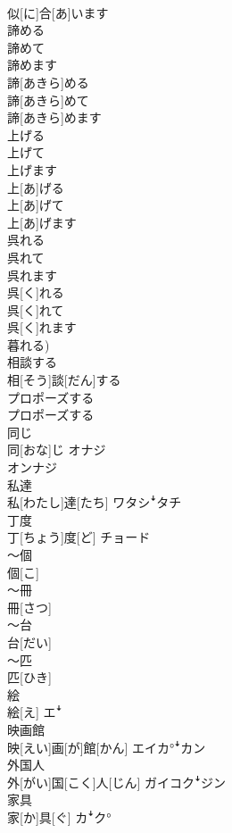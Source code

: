 \documentclass[8pt]{extreport}
\begin{document}
\begin{CJK}{UTF8}{min}
\\	似[に]合[あ]います	
\\	諦める 
\\	諦めて 
\\	諦めます	
\\	諦[あきら]める 
\\	諦[あきら]めて 
\\	諦[あきら]めます	
\\	上げる 
\\	上げて 
\\	上げます	
\\	上[あ]げる 
\\	上[あ]げて 
\\	上[あ]げます	
\\	呉れる 
\\	呉れて 
\\	呉れます	
\\	呉[く]れる 
\\	呉[く]れて 
\\	呉[く]れます 
\\	暮れる)	
\\	相談する	
\\	相[そう]談[だん]する	
\\	プロポーズする	
\\	プロポーズする	
\\	同じ	
\\	同[おな]じ	オナジ 
\\	オンナジ
\\	私達	
\\	私[わたし]達[たち]	ワタシꜜタチ
\\	丁度	
\\	丁[ちょう]度[ど]	チョード
\\	～個	
\\	個[こ]	
\\	～冊	
\\	冊[さつ]	
\\	～台	
\\	台[だい]	
\\	～匹	
\\	匹[ひき]	
\\	絵	
\\	絵[え]	エꜜ
\\	映画館	
\\	映[えい]画[が]館[かん]	エイカ°ꜜカン
\\	外国人	
\\	外[がい]国[こく]人[じん]	ガイコクꜜジン
\\	家具	
\\	家[か]具[ぐ]	カꜜク°

\end{CJK}
\end{document}
